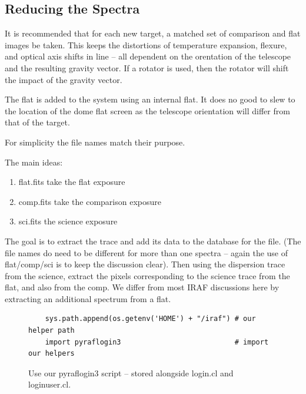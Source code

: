 \subsection{Reducing the Spectra}

It is recommended that for each new target, a matched set of comparison
and flat images be taken. This keeps the distortions of temperature
expansion, flexure, and optical axis shifts in line -- all dependent
on the orentation of the telescope and the resulting gravity vector.
If a rotator is used, then the rotator will shift the impact of the
gravity vector.

The flat is added to the system using an internal flat. It does no
good to slew to the location of the dome flat screen as the telescope
orientation will differ from that of the target.

For simplicity the file names match their purpose.

The main ideas:
\vspace{-.15cm}
\begin{enumerate}\addtolength{\itemsep}{-0.5\baselineskip}
   \item   flat.fits take the flat exposure
   \item   comp.fits take the comparison exposure
   \item   sci.fits  the science exposure
\end{enumerate}

The goal is to extract the trace and add its data to the database for
the file. (The file names do need to be different for more than one
spectra -- again the use of flat/comp/sci is to keep the discussion
clear). Then using the dispersion trace from the science, extract the
pixels corresponding to the science trace from the flat, and also from
the comp. We differ from most IRAF discussions here by extracting an
additional spectrum from a flat.

\begin{figure}
\begingroup \fontsize{10pt}{10pt}
\selectfont
{\color{darkred}
\begin{verbatim} 
    sys.path.append(os.getenv('HOME') + "/iraf") # our helper path
    import pyraflogin3                           # import our helpers
\end{verbatim}
}
\endgroup
\caption{Use our pyraflogin3 script -- stored alongside login.cl and
loginuser.cl.}
\label{fig:pyraflogin3}
\end{figure}


